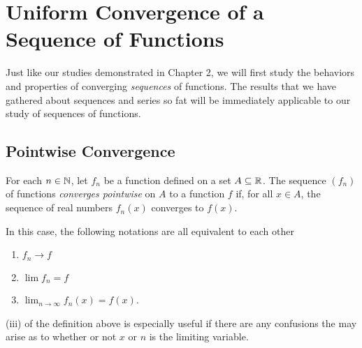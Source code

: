 \section{Uniform Convergence of a Sequence of Functions}


Just like our studies demonstrated in Chapter 2, we will first study the behaviors and properties of converging \textit{sequences} of functions. The results that we have gathered about sequences and series so fat will be immediately applicable to our study of sequences of functions.

\subsection{Pointwise Convergence} 

\begin{definition}
For each \( n \in \mathbb{N}  \), let \( f_n \) be a function defined on a set \( A \subseteq \mathbb{R}  \). The sequence \( (f_n)  \) of functions \textit{converges pointwise }  on \( A  \) to a function \( f  \) if, for all \( x \in A  \), the sequence of real numbers \( f_n(x)  \) converges to \( f(x)  \). 

In this case, the following notations are all equivalent to each other
\begin{enumerate}
    \item[(i)] \( f_n \to f  \) 
    \item[(ii)] \( \lim f_n = f  \)
    \item[(iii)] \( \lim_{ n \to \infty  } f_n(x) = f(x)  \).
\end{enumerate}
\end{definition}

(iii) of the definition above is especially useful if there are any confusions the may arise as to whether or not \( x  \) or \( n  \) is the limiting variable.

